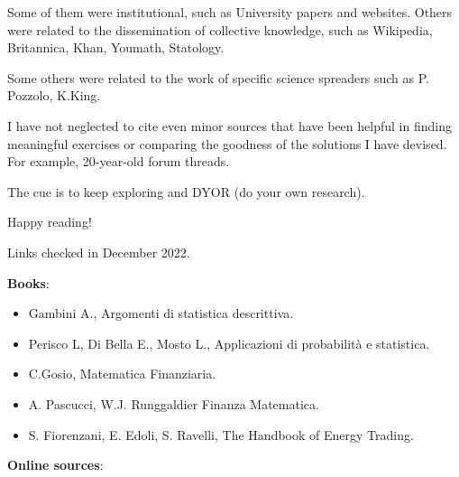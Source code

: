 \documentclass{article}
\begin{document}
Some of them were institutional, such as University papers and websites. 
Others were related to the dissemination of collective knowledge, such as Wikipedia, Britannica, Khan, Youmath, Statology.

Some others were related to the work of specific science spreaders such as P. Pozzolo, K.King.

I have not neglected to cite even minor sources that have been helpful in finding meaningful exercises or comparing the goodness of the solutions I have devised. For example, 20-year-old forum threads.

The cue is to keep exploring and DYOR (do your own research). 

Happy reading!

Links checked in December 2022.

\textbf{Books}:
\begin{itemize}
    \item Gambini A., Argomenti di statistica descrittiva.
    \item Perisco L, Di Bella E., Mosto L., Applicazioni di probabilità e statistica.
    \item C.Gosio, Matematica Finanziaria.
    \item A. Pascucci, W.J. Runggaldier Finanza Matematica.
    \item S. Fiorenzani, E. Edoli, S. Ravelli, The Handbook of Energy Trading.
\end{itemize}
\textbf{Online sources}:
\end{document}
